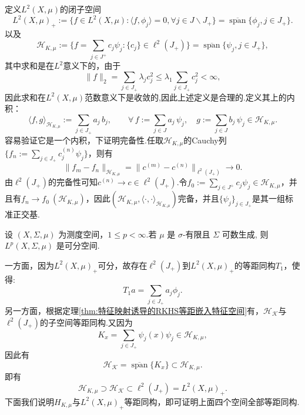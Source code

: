 \documentclass[../master.tex]{subfiles}
\begin{document}
定义$L^2(X,\mu)$的闭子空间
\begin{equation*}
    L^2(X,\mu)_+:=\{f\in L^2(X,\mu):\langle f,\phi_j\rangle = 0,\forall j\in J\backslash J_+\}=\overline{\operatorname{span}}\{\phi_j,j\in J_+\}.
\end{equation*}
以及
\begin{equation*}
    \mathcal{H}_{K,\mu}:=\{f=\sum_{j\in J^+}c_j\psi_j:\{c_j\}\in\ell^2(J_+)\}=\overline{\operatorname{span}}\{\psi_j,j\in J_+\},
\end{equation*}
其中求和是在$L^2$意义下的，由于
\begin{equation*}
    \|f\|_2 = \sum_{j\in J_+}\lambda_j c_j^2\leq \lambda_1\sum_{j\in J_+}c_j^2<\infty,
\end{equation*}
因此求和在$L^2(X,\mu)$范数意义下是收敛的,因此上述定义是合理的.定义其上的内积：
\begin{equation}\label{eq: H_Kmu 内积}
    \langle f , g \rangle_{\mathcal{H}_{K,\mu}}
:= \sum_{j\in J_+} a_j\,b_j,
\qquad
\forall\, 
f := \sum_{j\in J}  a_j\, \psi_j,\quad
g := \sum_{j\in J}  b_j\, \psi_j \in \mathcal{H}_{K,\mu}.
\end{equation}
容易验证它是一个内积，下证明完备性.任取$\mathcal{H}_{K,\mu}$的Cauchy列$\{f_n:=\sum_{j\in J_+}c^{(n)}_j\psi_j\}$，则有
\begin{equation*}
    \|f_m - f_n\|_{\mathcal{H}_{K,\mu}} = \|c^{(m)}-c^{(n)}\|_{\ell^2(J_+)}\to 0.
\end{equation*}
由$\ell^2(J_+)$的完备性可知$c^{(n)}\to c\in\ell^2(J_+).$令$f_0:=\sum_{j\in J^+}c_j\psi_j\in\mathcal{H}_{K,\mu}$，并且有$f_n\to f_0~(\mathcal{H}_{K,\mu})$，因此$\left(\mathcal{H}_{K,\mu},\langle\cdot,\cdot\rangle_{\mathcal{H}_{K,\mu}}\right)$完备，并且$\{\psi_j\}_{j\in J_+}$是其一组标准正交基.

\begin{proposition}
设 $(X,\Sigma,\mu)$ 为测度空间，$1\le p<\infty$.若 $\mu$ 是 $\sigma$-有限且 $\Sigma$ 可数生成, 则
  $L^p(X,\Sigma,\mu)$ 是可分空间.
\end{proposition}


一方面，因为$L^2(X,\mu)_+$可分，故存在$\ell^2(J_+)$到$L^2(X,\mu)_+$的等距同构$T_1$，使得:
\begin{equation*}
    T_1a = \sum_{j\in J_+}a_j\phi_j.
\end{equation*}
另一方面，根据定理\ref{thm:特征映射诱导的RKHS等距嵌入特征空间}有，$\mathcal{H_K}$与$\ell^2(J_+)$的子空间等距同构.又因为
\begin{equation*}
    K_x = \sum_{j\in J_+}\psi_j(x)\psi_j\in \mathcal{H}_{K,\mu},
\end{equation*}
因此有
\begin{equation*}
    \mathcal{H_K}=\overline{\operatorname{span}}\{K_x\}\subset \mathcal{H}_{K,\mu}.
\end{equation*}
即有
\begin{equation}\label{eq:四个空间包含关系}
    \mathcal{H}_{K,\mu}\supset \mathcal{H_K}\subset{\ell^2(J_+)}=L^2(X,\mu)_+.
\end{equation}
下面我们说明$H_{K,\mu}$与$L^2(X,\mu)_+$等距同构，即可证明上面四个空间全部等距同构.
\end{document}
